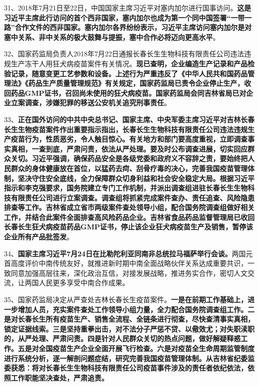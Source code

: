 31、2018年7月21日至22日，中国国家主席习近平对塞内加尔进行国事访问。{\textbf{这是习近平主席此行访问的首个西非国家，塞内加尔也成为第一个同中国签署``一带一路''合作文件的西非国家。塞内加尔各界纷纷表示，习近平主席访问塞内加尔是对塞中关系、非中关系的极大鼓舞与提振，塞中合作必将迈向更高水平}}。

32、国家药监局负责人2018年7月22日通报长春长生生物科技有限责任公司违法违规生产冻干人用狂犬病疫苗案件有关情况。{\textbf{现已查明，企业编造生产记录和产品检验记录，随意变更工艺参数和设备。上述行为严重违反了《中华人民共和国药品管理法》《药品生产质量管理规范》有关规定，国家药监局已责令企业停止生产，收回药品GMP证书，召回尚未使用的狂犬病疫苗。国家药监局会同吉林省局已对企业立案调查，涉嫌犯罪的移送公安机关追究刑事责任}}。

33、{\textbf{正在国外访问的中共中央总书记、国家主席、中央军委主席习近平对吉林长春长生生物疫苗案件作出重要指示指出，长春长生生物科技有限责任公司违法违规生产疫苗行为，性质恶劣，令人触目惊心。有关地方和部门要高度重视，立即调查事实真相，一查到底，严肃问责，依法从严处理。要及时公布调查进展，切实回应群众关切。习近平强调，确保药品安全是各级党委和政府义不容辞之责，要始终把人民群众的身体健康放在首位，以猛药去疴、刮骨疗毒的决心，完善我国疫苗管理体制，坚决守住安全底线，全力保障群众切身利益和社会安全稳定大局。根据习近平指示和李克强要求，国务院建立专门工作机制，并派出调查组进驻长春长生生物科技有限责任公司进行立案调查。调查组将抓紧完成案件查办、责任追查、风险隐患排查等工作。吉林省成立省市两级案件查处领导小组，配合国务院调查组做好相关工作，并结合此案件全面排查高风险药品企业。吉林省食品药品监督管理局已收回长春长生狂犬病疫苗药品GMP证书，停止该企业狂犬病疫苗生产及销售，暂停该企业所有产品批签发}}。

34、{\textbf{国家主席习近平7月24日在比勒陀利亚同南非总统拉马福萨举行会谈。}}两国元首高度评价中南传统友好，就推进新时期中南全面战略伙伴关系达成重要共识，一致同意加强高层往来，深化政治互信，对接发展战略，推进务实合作，密切人文交流，让两国人民更多享受中南合作成果。

35、国家药监局决定从严查处吉林长春长生疫苗案件。{\textbf{一是在前期工作基础上，进一步增加人员，充实案件查处工作领导小组力量，全力配合国务院调查组工作。二是对长春长生所有疫苗生产、销售全流程、全链条进行彻查，尽快查清事实真相，锁定证据线索。三是坚持重拳出击，对不法分子严惩不贷、以儆效尤；对失职渎职的，从严处理、严肃问责。四是针对人民群众关切的热点问题，做好解疑释惑工作。五是对全国疫苗生产企业全面开展飞行检查。六是对疫苗全生命周期监管制度进行系统分析，逐一解剖问题症结，研究完善我国疫苗管理体制。从吉林省纪委监委获悉：将对长春长生生物科技有限责任公司疫苗事件涉及的责任者依纪依法，依照工作职能坚决查处，严肃追责。}}

